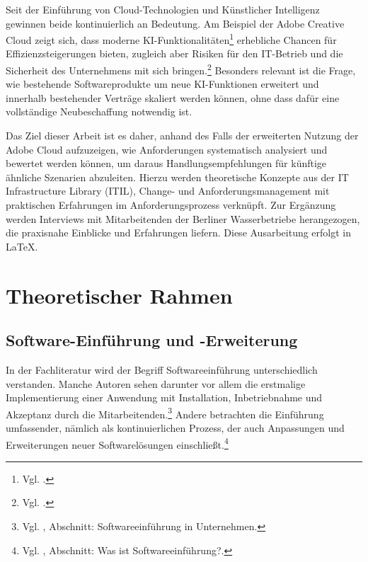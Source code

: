 \documentclass[
    12pt, 
    a4paper,
    ]{scrartcl} %
\begin{document}
Seit der Einführung von Cloud-Technologien und Künstlicher Intelligenz gewinnen beide kontinuierlich an Bedeutung. Am Beispiel der Adobe Creative Cloud zeigt sich, dass moderne KI-Funktionalitäten\footnote{Vgl. \cite{S_AdobeAI}.} erhebliche Chancen für Effizienzsteigerungen bieten, zugleich aber Risiken für den IT-Betrieb und die Sicherheit des Unternehmens mit sich bringen.\footnote{Vgl. \cite{S_Ambient}.} Besonders relevant ist die Frage, wie bestehende Softwareprodukte um neue KI-Funktionen erweitert und innerhalb bestehender Verträge skaliert werden können, ohne dass dafür eine vollständige Neubeschaffung notwendig ist.

Das Ziel dieser Arbeit ist es daher, anhand des Falls der erweiterten Nutzung der Adobe Cloud aufzuzeigen, wie Anforderungen systematisch analysiert und bewertet werden können, um daraus Handlungsempfehlungen für künftige ähnliche Szenarien abzuleiten. Hierzu werden theoretische Konzepte aus der IT Infrastructure Library (ITIL), Change- und Anforderungsmanagement mit praktischen Erfahrungen im Anforderungsprozess verknüpft. Zur Ergänzung werden Interviews mit Mitarbeitenden der Berliner Wasserbetriebe herangezogen, die praxisnahe Einblicke und Erfahrungen liefern. Diese Ausarbeitung erfolgt in LaTeX.

\section{Theoretischer Rahmen}
\subsection{Software-Einführung und -Erweiterung}
In der Fachliteratur wird der Begriff Softwareeinführung unterschiedlich verstanden. Manche Autoren sehen darunter vor allem die erstmalige Implementierung einer Anwendung mit Installation, Inbetriebnahme und Akzeptanz durch die Mitarbeitenden.\footnote{Vgl. \cite{papershift2022}, Abschnitt: Softwareeinführung in Unternehmen.} Andere betrachten die Einführung umfassender, nämlich als kontinuierlichen Prozess, der auch Anpassungen und Erweiterungen neuer Softwarelösungen einschließt.\footnote{Vgl. \cite{pureconsultant2023}, Abschnitt: Was ist Softwareeinführung?.} 
\end{document}
